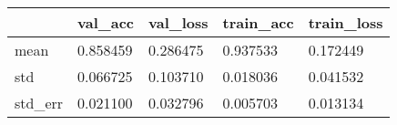 \begin{tabular}{|l|l|l|l|l|}
\toprule \hline
 & val\_acc & val\_loss & train\_acc & train\_loss \\ \hline
\midrule
mean & 0.858459 & 0.286475 & 0.937533 & 0.172449 \\ \hline
std & 0.066725 & 0.103710 & 0.018036 & 0.041532 \\ \hline
std\_err & 0.021100 & 0.032796 & 0.005703 & 0.013134 \\ \hline
\bottomrule
\end{tabular}
